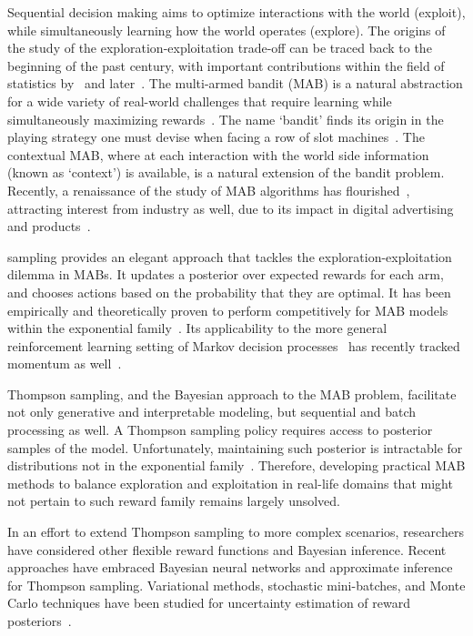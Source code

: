 Sequential decision making aims to optimize interactions with the world (exploit), while simultaneously learning how the world operates (explore). The origins of the study of the exploration-exploitation trade-off can be traced back to the beginning of the past century, with important contributions within the field of statistics by~\citet{j-Thompson1935} and later~\citet{j-Robbins1952}.
The multi-armed bandit (MAB) is a natural abstraction for a wide variety of real-world challenges that require learning while simultaneously maximizing rewards~\citep{b-Lattimore2020}. The name `bandit' finds its origin in the playing strategy one must devise when facing a row of slot machines~\citep{j-Lai1985}. The contextual MAB, where at each interaction with the world side information (known as `context') is available, is a natural extension of the bandit problem. Recently, a renaissance of the study of MAB algorithms has flourished~\citep{ip-Agrawal2012,ip-Maillard2011}, attracting interest from industry as well, due to its impact in digital advertising and products~\citep{ip-Li2010}. 

\citet{j-Thompson1933} sampling %
provides an elegant approach that tackles the exploration-exploitation dilemma in MABs. It updates a posterior over expected rewards for each arm, and chooses actions based on the probability that they are optimal. It has been empirically and theoretically proven to perform competitively for MAB models within the exponential family~\citep{ip-Agrawal2013a,ip-Agrawal2013,ic-Korda2013}. Its applicability to the more general reinforcement learning setting of Markov decision processes~\citep{j-Burnetas1997} has recently tracked momentum as well~\citep{ip-Gopalan2015,ic-Ouyang2017}.

Thompson sampling, and the Bayesian approach to the MAB problem, facilitate not only generative and interpretable modeling, but sequential and batch processing as well.
A Thompson sampling policy requires access to posterior samples of the model.
Unfortunately, maintaining such posterior is intractable for distributions not in the exponential family~\citep{j-Russo2018}.
Therefore, developing practical MAB methods to balance exploration and exploitation in real-life domains that might not pertain to such reward family remains largely unsolved.

In an effort to extend Thompson sampling to more complex scenarios, researchers have considered other flexible reward functions and Bayesian inference.
Recent approaches have embraced Bayesian neural networks and approximate inference for Thompson sampling. Variational methods, stochastic mini-batches, and Monte Carlo techniques have been studied for uncertainty estimation of reward posteriors~\citep{ip-Blundell2015, ic-Kingma2015, ip-Lipton2018, ic-Osband2016, ip-Li2016}.


